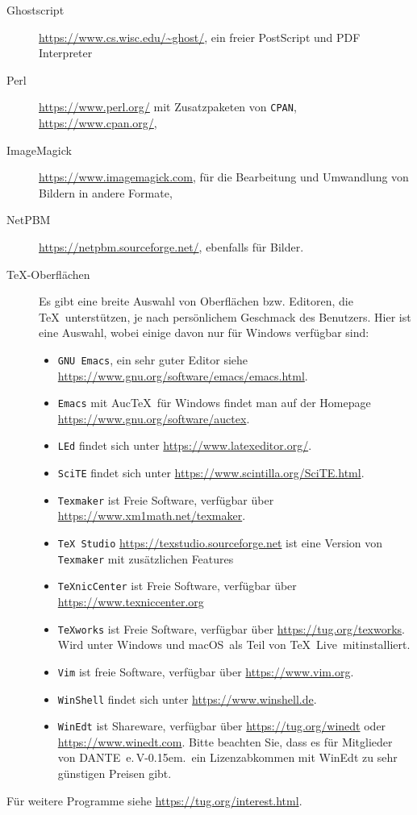 \documentclass[12pt,ngerman,a4paper,fullparskip]{report}
\newcommand{\TL}{\TeX\ Live\xspace}
\newcommand{\acro}[1]{\texttt{#1}}
\newcommand{\cmdname}[1]{\texttt{#1}}
\providecommand*{\macOS}{macOS\xspace}
\newcommand{\dante}{DANTE~e.\,V\kern-0.15em.}
\begin{document}
\begin{description}
\item[Ghostscript] \url{https://www.cs.wisc.edu/~ghost/}, ein freier PostScript und PDF Interpreter
\item[Perl] \url{https://www.perl.org/} mit Zusatzpaketen von
      \acro{CPAN}, \url{https://www.cpan.org/},
\item[ImageMagick] \url{https://www.imagemagick.com}, für die Bearbeitung
      und Umwandlung von Bildern in andere Formate,
\item[NetPBM] \url{https://netpbm.sourceforge.net/}, ebenfalls für Bilder.

\item[\TeX-Oberflächen] Es gibt eine breite Auswahl von Oberflächen bzw.
     Editoren, die \TeX\ unterstützen, je nach persönlichem Geschmack des
     Benutzers. Hier ist eine Auswahl, wobei einige davon nur für Windows verfügbar sind:
  \begin{itemize}
  \item \cmdname{GNU Emacs}, ein sehr guter Editor siehe
        \url{https://www.gnu.org/software/emacs/emacs.html}.
  \item \cmdname{Emacs} mit Auc\TeX\ für Windows findet man auf der Homepage  \url{https://www.gnu.org/software/auctex}.
  \item \cmdname{LEd} findet sich unter \url{https://www.latexeditor.org/}.
  \item \cmdname{SciTE} findet sich unter
        \url{https://www.scintilla.org/SciTE.html}.
  \item \cmdname{Texmaker} ist Freie Software, verfügbar über
        \url{https://www.xm1math.net/texmaker}.
  \item \cmdname{TeX Studio} \url{https://texstudio.sourceforge.net}
        ist eine Version von \cmdname{Texmaker} mit zusätzlichen Features
  \item \cmdname{TeXnicCenter} ist Freie Software, verfügbar über
        \url{https://www.texniccenter.org}
  \item \cmdname{TeXworks} ist Freie Software, verfügbar über
        \url{https://tug.org/texworks}. Wird unter Windows und
        \macOS\ als Teil von \TL\  mitinstalliert.
  \item \cmdname{Vim} ist freie Software, verfügbar über
        \url{https://www.vim.org}.
  \item \cmdname{WinShell} findet sich unter \url{https://www.winshell.de}.
  \item \cmdname{WinEdt} ist Shareware, verfügbar über
        \url{https://tug.org/winedt} oder \url{https://www.winedt.com}.
        Bitte beachten Sie, dass es für Mitglieder von \dante\ ein
        Lizenzabkommen mit WinEdt zu sehr günstigen Preisen gibt. 
  \end{itemize}
\end{description}
Für weitere Programme siehe \url{https://tug.org/interest.html}.
\end{document}

